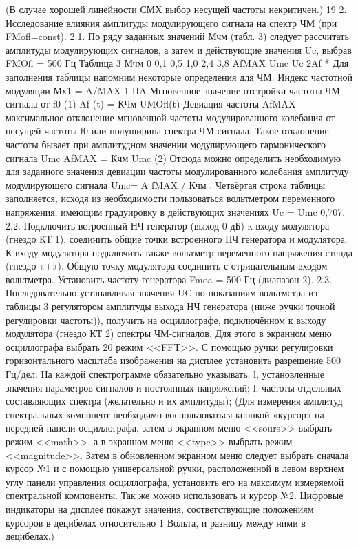 ﻿\documentclass[a4paper,12pt]{article}
\begin{document}
(В случае хорошей линейности СМХ выбор несущей частоты некритичен.)
19
2.	Исследование влияния амплитуды модулирующего сигнала на спектр ЧМ (при FMofl=const).
2.1.	По ряду заданных значений Мчм (табл. 3) следует рассчитать амплитуды модулирующих сигналов, а затем и действующие значения Uc, выбрав FMOfl = 500 Гц
Таблица 3
Мчм	0	0,1	0,5	1,0	2,4	3,8
AfMAX						
Umc						
Uc						
2Af *						
Для заполнения таблицы напомним некоторые определения для ЧМ. Индекс частотной модуляции
Мх1 =
A/MAX 1 IIA
Мгновенное значение отстройки частоты ЧМ-сигнала от f0
(1)
Af (t) = КЧм UMOfl(t)
Девиация частоты AfMAX - максимальное отклонение мгновенной частоты модулированного колебания от несущей частоты f0 или полуширина спектра ЧМ-сигнала. Такое отклонение частоты бывает при амплитудном значении модулирующего гармонического сигнала Umc
AfMAX = Кчм Umc	(2)
Отсюда можно определить необходимую для заданного значения девиации частоты модулированного колебания амплитуду модулирующего сигнала Umc= A fMAX / Кчм .
Четвёртая строка таблицы заполняется, исходя из необходимости пользоваться вольтметром переменного напряжения, имеющим градуировку в действующих значениях
Uc = Umc 0,707.
2.2. Подключить встроенный НЧ генератор (выход 0 дБ) к входу модулятора (гнездо КТ 1), соединить общие точки встроенного НЧ генератора и модулятора. К входу модулятора подключить также вольтметр переменного напряжения стенда (гнездо «+»). Общую точку модулятора соединить с отрицательным входом вольтметра. Установить частоту генератора Fmoa = 500 Гц (диапазон 2).
2.3.	Последовательно устанавливая значения UC по показаниям вольтметра из таблицы 3 регулятором амплитуды выхода НЧ генератора (ниже ручки точной регулировки частоты)), получить на осциллографе, подключённом к выходу модулятора (гнездо КТ 2) спектры ЧМ-сигналов. Для этого в экранном меню осциллографа выбрать
20
режим <<FFT>>. С помощью ручки регулировки горизонтального масштаба изображения на дисплее установить разрешение 500 Гц/дел. На каждой спектрограмме обязательно указывать:
l,	установленные значения параметров сигналов и постоянных напряжений;
l,	частоты отдельных составляющих спектра (желательно и их амплитуды);
(Для	измерения амплитуд спектральных компонент необходимо
воспользоваться кнопкой «курсор» на передней панели осциллографа, затем в экранном меню <<sours>> выбрать режим <<math>>, а в экранном меню <<type>> выбрать режим <<magnitude>>. Затем в обновленном экранном меню следует выбрать сначала курсор №1 и с помощью универсальной ручки, расположенной в левом верхнем углу панели управления осциллографа, установить его на максимум измеряемой спектральной компоненты. Так же можно использовать и курсор №2. Цифровые индикаторы на дисплее покажут значения, соответствующие положениям курсоров в децибелах относительно 1 Вольта, и разницу между ними в децибелах.)
\end{document}
